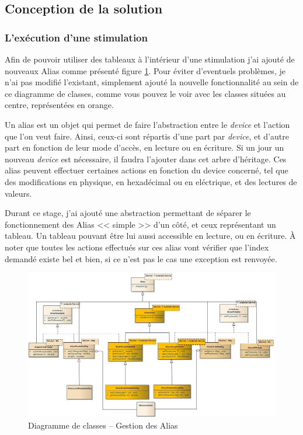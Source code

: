 \subsection{Conception de la solution}
\subsubsection{L'exécution d'une stimulation}
Afin de pouvoir utiliser des tableaux à l'intérieur d'une stimulation j'ai ajouté de nouveaux Alias comme présenté figure \ref{fig:aliasClasses}. Pour éviter d'eventuels problèmes, je n'ai pas modifié l'existant, simplement ajouté la nouvelle fonctionnalité au sein de ce diagramme de classes, comme vous pouvez le voir avec les classes situées au centre, représentées en orange.

Un alias est un objet qui permet de faire l'abstraction entre le \textit{device} et l'action que l'on veut faire. Ainsi, ceux-ci sont répartis d'une part par \textit{device}, et d'autre part en fonction de leur mode d'accès, en lecture ou en écriture. Si un jour un nouveau \textit{device} est nécessaire, il faudra l'ajouter dans cet arbre d'héritage. Ces alias peuvent effectuer certaines actions en fonction du device concerné, tel que des modifications en physique, en hexadécimal ou en eléctrique, et des lectures de valeurs.

Durant ce stage, j'ai ajouté une abstraction permettant de séparer le fonctionnement des Alias << simple >> d'un côté, et ceux représentant un tableau. Un tableau pouvant être lui aussi accessible en lecture, ou en écriture. À noter que toutes les actions effectués sur ces alias vont vérifier que l'index demandé existe bel et bien, si ce n'est pas le cas une exception est renvoyée. 
\begin{figure}[H]
\hspace{-35px}
\includegraphics[width=20.5cm]{contents/images/alias.jpg}
\caption{Diagramme de classes -- Gestion des Alias}
\label{fig:aliasClasses}
\end{figure}

